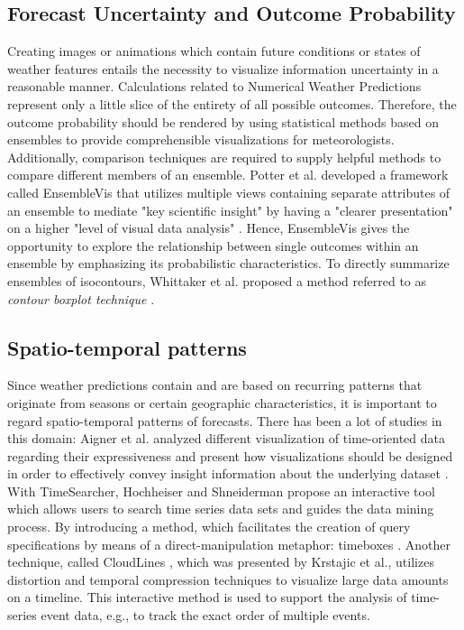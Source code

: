 \documentclass[citeauthoryear]{llncs}
\begin{document}
\subsection{Forecast Uncertainty and Outcome Probability}
Creating images or animations which contain future conditions or states of weather features entails the necessity to visualize information uncertainty in a reasonable manner. Calculations related to Numerical Weather Predictions represent only a little slice of the entirety of all possible outcomes. Therefore, the outcome probability should be rendered by using statistical methods based on ensembles to provide comprehensible visualizations for meteorologists. Additionally, comparison techniques are required to supply helpful methods to compare different members of an ensemble. Potter et al. developed a framework called EnsembleVis that utilizes multiple views containing separate attributes of an ensemble to mediate "key scientific insight" by having a "clearer presentation" on a higher "level of visual data analysis" \cite{potter2009ensemble}. Hence, EnsembleVis gives the opportunity to explore the relationship between single outcomes within an ensemble by emphasizing its probabilistic characteristics. To directly summarize ensembles of isocontours, Whittaker et al. proposed a method referred to as \textit{contour boxplot technique} \cite{whitaker2013contour}.  

\subsection{Spatio-temporal patterns}
Since weather predictions contain and are based on recurring patterns that originate from seasons or certain geographic characteristics, it is important to regard spatio-temporal patterns of forecasts. There has been a lot of studies in this domain: Aigner et al. analyzed different visualization of time-oriented data regarding their expressiveness and present how visualizations should be designed in order to effectively convey insight information about the underlying dataset \cite{aigner2011visualization}. With TimeSearcher, Hochheiser and Shneiderman propose an interactive tool which allows users to search time series data sets and guides the data mining process. By introducing a method, which facilitates the creation of query specifications by means of a direct-manipulation metaphor: timeboxes \cite{hochheiser2001interactive}. Another technique, called CloudLines \cite{krstajic2011cloudlines}, which was presented by Krstajic et al., utilizes distortion and temporal compression techniques to visualize large data amounts on a timeline. This interactive method is used to support the analysis of time-series event data, e.g., to track the exact order of multiple events. 
\end{document}
